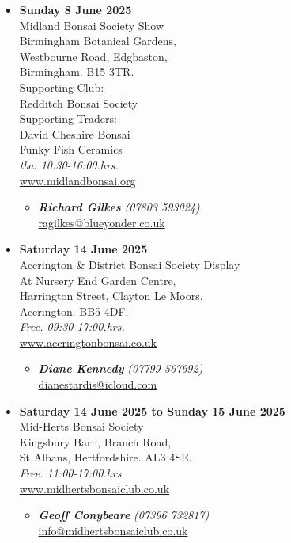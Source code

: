\begin{itemize}
    \item \textbf{Sunday 8 June 2025}
    \\
    Midland Bonsai Society Show \\
    Birmingham Botanical Gardens, \\
    Westbourne Road, Edgbaston, \\
    Birmingham. B15 3TR. \\
    Supporting Club: \\
    Redditch Bonsai Society \\
    Supporting Traders: \\
    David Cheshire Bonsai \\
    Funky Fish Ceramics
    \\
    \emph{tba. 10:30-16:00.hrs.}
    \\
    \href{https://www.midlandbonsai.org}{www.midlandbonsai.org}
    \begin{itemize}
        \item \textbf{\emph{Richard Gilkes}} \emph{(07803 593024)} \\
        \href{mailto:ragilkes@blueyonder.co.uk}{ragilkes@blueyonder.co.uk} 
    \end{itemize}

    \item \textbf{Saturday 14 June 2025}
    \\
    Accrington \& District Bonsai Society Display \\
    At Nursery End Garden Centre, \\
    Harrington Street, Clayton Le Moors, \\
    Accrington. BB5 4DF.
    \\
    \emph{Free. 09:30-17:00.hrs.}
    \\
    \href{https://www.accringtonbonsai.co.uk}{www.accringtonbonsai.co.uk}
    \begin{itemize}
        \item \textbf{\emph{Diane Kennedy}} \emph{(07799 567692)} \\
        \href{mailto:dianestardis@icloud.com}{dianestardis@icloud.com} 
    \end{itemize}

    \item \textbf{Saturday 14 June 2025 to Sunday 15 June 2025}
    \\
    Mid-Herts Bonsai Society \\
    Kingsbury Barn, Branch Road, \\
    St Albans, Hertfordshire. AL3 4SE.
    \\
    \emph{Free. 11:00-17:00.hrs}
    \\
    \href{https://www.midhertsbonsaiclub.co.uk}{www.midhertsbonsaiclub.co.uk}
    \begin{itemize}
        \item \textbf{\emph{Geoff Conybeare}} \emph{(07396 732817)} \\
        \href{mailto:info@midhertsbonsaiclub.co.uk}{info@midhertsbonsaiclub.co.uk} 
    \end{itemize}

\end{itemize}
\closearticle
